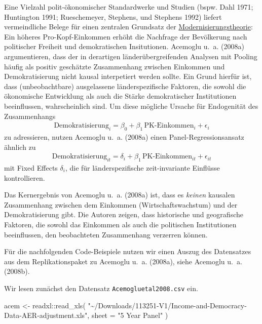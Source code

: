 \documentclass[
  a4paper,
  DIV=11,
  oneside]{scrreprt}
\newenvironment{Shaded}{\begin{snugshade}}{\end{snugshade}}
\newcommand{\AttributeTok}[1]{\textcolor[rgb]{0.40,0.45,0.13}{#1}}
\newcommand{\FunctionTok}[1]{\textcolor[rgb]{0.28,0.35,0.67}{#1}}
\newcommand{\NormalTok}[1]{\textcolor[rgb]{0.00,0.23,0.31}{#1}}
\newcommand{\OtherTok}[1]{\textcolor[rgb]{0.00,0.23,0.31}{#1}}
\newcommand{\SpecialCharTok}[1]{\textcolor[rgb]{0.37,0.37,0.37}{#1}}
\newcommand{\StringTok}[1]{\textcolor[rgb]{0.13,0.47,0.30}{#1}}
\begin{document}
Eine Vielzahl polit-ökonomischer Standardwerke und Studien (bspw. Dahl
1971; Huntington 1991; Rueschemeyer, Stephens, und Stephens 1992)
liefert vermeindliche Belege für einen zentralen Grundsatz der
\href{https://de.wikipedia.org/wiki/Modernisierungstheorie}{Modernisierungstheorie}:
Ein höheres Pro-Kopf-Einkommen erhöht die Nachfrage der Bevölkerung nach
politischer Freiheit und demokratischen Insitutionen. Acemoglu u.~a.
(2008a) argumentieren, dass der in derartigen länderübergreifenden
Analysen mit Pooling häufig als positiv geschätzte Zusammenhang zwischen
Einkommen und Demokratisierung nicht kausal interpetiert werden sollte.
Ein Grund hierfür ist, dass (unbeobachtbare) ausgelassene
länderspezifische Faktoren, die sowohl die ökonomische Entwicklung als
auch die Stärke demokratischer Institutionen beeinflussen,
wahrscheinlich sind. Um diese mögliche Ursache für Endogenität des
Zusammenhangs \begin{align}
  \text{Demokratisierung}_i = \beta_0 + \beta_1\,\text{PK-Einkommen}_i + \epsilon_i
\end{align} zu adressieren, nutzen Acemoglu u.~a. (2008a) einen
Panel-Regressionsansatz ähnlich zu \begin{align}
  \text{Demokratisierung}_{it} = \delta_i + \beta_1\,\text{PK-Einkommen}_{it} + \epsilon_{it}
\end{align} mit Fixed Effects \(\delta_i\), die für länderspezifische
zeit-invariante Einflüsse kontrollieren.

Das Kernergebnis von Acemoglu u.~a. (2008a) ist, dass es \emph{keinen}
kausalen Zusammenhang zwischen dem Einkommen (Wirtschaftswachstum) und
der Demokratisierung gibt. Die Autoren zeigen, dass historische und
geografische Faktoren, die sowohl das Einkommen als auch die politischen
Institutionen beeinflussen, den beobachteten Zusammenhang verzerren
können.

Für die nachfolgenden Code-Beispiele nutzen wir einen Auszug des
Datensatzes aus dem Replikationspaket zu Acemoglu u.~a. (2008a), siehe
Acemoglu u.~a. (2008b).

Wir lesen zunächst den Datensatz \texttt{Acemogluetal2008.csv} ein.

\begin{Shaded}
\begin{Highlighting}[]
\NormalTok{acem }\OtherTok{\textless{}{-}}\NormalTok{ readxl}\SpecialCharTok{::}\FunctionTok{read\_xls}\NormalTok{(}
  \StringTok{"\textasciitilde{}/Downloads/113251{-}V1/Income{-}and{-}Democracy{-}Data{-}AER{-}adjustment.xls"}\NormalTok{, }
  \AttributeTok{sheet =} \StringTok{"5 Year Panel"}
\NormalTok{)}
\end{Highlighting}
\end{Shaded}
\end{document}
